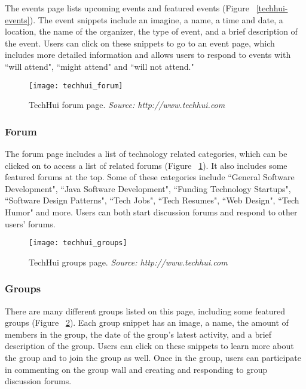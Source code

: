 The events page lists upcoming events and featured events (Figure ~\ref{techhui-events}). The event snippets include an imagine, a name, a time and date, a location, the name of the organizer, the type of event, and a brief description of the event. Users can click on these snippets to go to an event page, which includes more detailed information and allows users to respond to events with ``will attend", ``might attend" and ``will not attend." 

\begin{figure}[h]
\centering
\texttt{[image: techhui\_forum]}
\caption{TechHui forum page. \textit{Source: http://www.techhui.com}}
\label{techhui-forum}
\end{figure}

\subsubsection{Forum}

The forum page includes a list of technology related categories, which can be clicked on to access a list of related forums (Figure ~\ref{techhui-forum}). It also includes some featured forums at the top. Some of these categories include ``General Software Development", ``Java Software Development", ``Funding Technology Startups", ``Software Design Patterns", ``Tech Jobs", ``Tech Resumes", ``Web Design", ``Tech Humor" and more. Users can both start discussion forums and respond to other users' forums. 

\begin{figure}[h]
\centering
\texttt{[image: techhui\_groups]}
\caption{TechHui groups page. \textit{Source: http://www.techhui.com}}
\label{techhui-groups}
\end{figure}

\subsubsection{Groups}

There are many different groups listed on this page, including some featured groups (Figure ~\ref{techhui-groups}). Each group snippet has an image, a name, the amount of members in the group, the date of the group's latest activity, and a brief description of the group. Users can click on these snippets to learn more about the group and to join the group as well. Once in the group, users can participate in commenting on the group wall and creating and responding to group discussion forums. 

